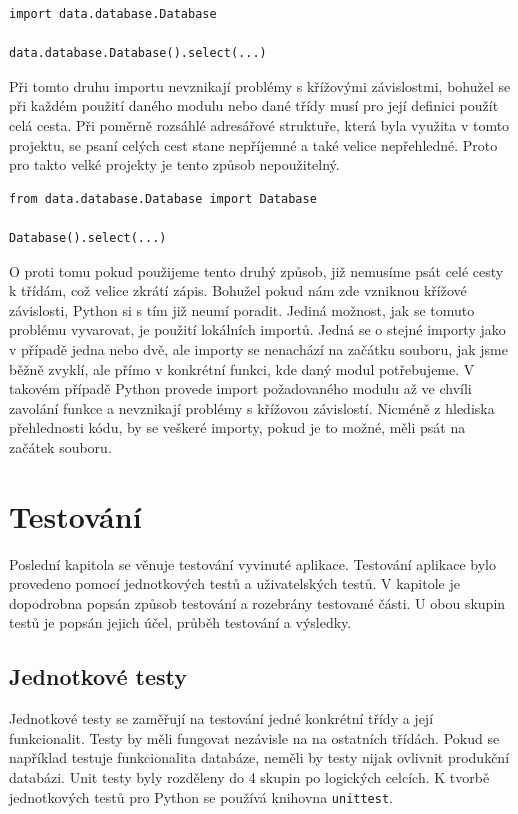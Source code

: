\documentclass[thesis=B,czech]{resources/FITthesis}[2012/06/26]
\begin{document}
\begin{listing}[htbp]
\begin{verbatim}
import data.database.Database

data.database.Database().select(...)
\end{verbatim}
\end{listing}

Při tomto druhu importu nevznikají problémy s křížovými závislostmi, bohužel se při každém použití daného modulu nebo dané třídy musí pro její definici použít celá cesta. Při poměrně rozsáhlé adresářové struktuře, která byla využita v tomto projektu, se psaní celých cest stane nepříjemné a také velice nepřehledné. Proto pro takto velké projekty je tento způsob nepoužitelný.

\begin{listing}[htbp]
\begin{verbatim}
from data.database.Database import Database

Database().select(...)
\end{verbatim}
\end{listing}
O proti tomu pokud použijeme tento druhý způsob, již nemusíme psát celé cesty k třídám, což velice zkrátí zápis. Bohužel pokud nám zde vzniknou křížové závislosti, Python si s tím již neumí poradit. Jediná možnost, jak se tomuto problému vyvarovat, je použití lokálních importů. Jedná se o stejné importy jako v případě jedna nebo dvě, ale importy se nenachází na začátku souboru, jak jsme běžně zvyklí, ale přímo v konkrétní funkci, kde daný modul potřebujeme. V takovém případě Python provede import požadovaného modulu až ve chvíli zavolání funkce a nevznikají problémy s křížovou závislostí. Nicméně z hlediska přehlednosti kódu, by se veškeré importy, pokud je to možné, měli psát na začátek souboru. 

\chapter{Testování}
Poslední kapitola se věnuje testování vyvinuté aplikace. Testování aplikace bylo provedeno pomocí jednotkových testů a uživatelských testů. V kapitole je dopodrobna popsán způsob testování a rozebrány testované části. U obou skupin testů je popsán jejich účel, průběh testování a výsledky.
	\section{Jednotkové testy}
Jednotkové testy se zaměřují na testování jedné konkrétní třídy a její funkcionalit. Testy by měli fungovat nezávisle na na ostatních třídách. Pokud se například testuje funkcionalita databáze, neměli by testy nijak ovlivnit produkční databázi. Unit testy byly rozděleny do 4 skupin po logických celcích. K tvorbě jednotkových testů pro Python se používá knihovna \texttt{unittest}.
\end{document}
